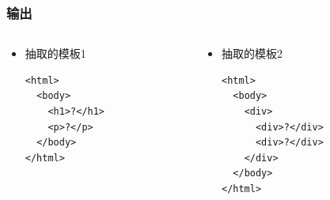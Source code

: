 \documentclass[11pt,presentation]{beamer}
\begin{document}
\begin{frame}[fragile]
\frametitle{输出}
\label{sec-1-3}
\begin{columns}[t]
\begin{column}{0.5\textwidth}
\begin{itemize}

\item 抽取的模板1\\
\label{sec-1-3-1}%
\lstset{extendedchars=false,basicstyle=\ttfamily\footnotesize,escapechar=`,breaklines,language=HTML}
\begin{lstlisting}
<html>
  <body>
    <h1>?</h1>
    <p>?</p>
  </body>
</html>
\end{lstlisting}
\end{itemize} %
\end{column}
\begin{column}{0.5\textwidth}
\begin{itemize}

\item 抽取的模板2\\
\label{sec-1-3-2}%
\lstset{extendedchars=false,basicstyle=\ttfamily\footnotesize,escapechar=`,breaklines,language=HTML}
\begin{lstlisting}
<html>
  <body>
    <div>
      <div>?</div>
      <div>?</div>
    </div>
  </body>
</html>
\end{lstlisting}

\end{itemize} %
\end{column}
\end{columns}
\end{frame}
\end{document}
